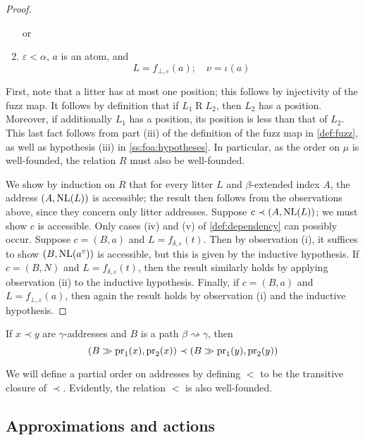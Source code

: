 \begin{proof}
\begin{enumerate}
        or
        \item \( \varepsilon < \alpha \), \( a \) is an atom, and
        \[ L = f_{\bot,\varepsilon}(a); \quad \nu = \iota(a) \]
    \end{enumerate}
    First, note that a litter has at most one position; this follows by injectivity of the fuzz map.
    It follows by definition that if \( L_1 \mathrel{R} L_2 \), then \( L_2 \) has a position.
    Moreover, if additionally \( L_1 \) has a position, its position is less than that of \( L_2 \).
    This last fact follows from part (iii) of the definition of the fuzz map in \cref{def:fuzz}, as well as hypothesis (iii) in \cref{ss:foa:hypotheses}.
    In particular, as the order on \( \mu \) is well-founded, the relation \( R \) must also be well-founded.

    We show by induction on \( R \) that for every litter \( L \) and \( \beta \)-extended index \( A \), the address \( (A, \operatorname{NL}(L)) \) is accessible; the result then follows from the observations above, since they concern only litter addresses.
    Suppose \( c \prec (A, \operatorname{NL}(L)) \); we must show \( c \) is accessible.
    Only cases (iv) and (v) of \cref{def:dependency} can possibly occur.
    Suppose \( c = (B, a) \) and \( L = f_{\delta,\varepsilon}(t) \).
    Then by observation (i), it suffices to show \( (B, \operatorname{NL}(a^\circ)) \) is accessible, but this is given by the inductive hypothesis.
    If \( c = (B, N) \) and \( L = f_{\delta,\varepsilon}(t) \), then the result similarly holds by applying observation (ii) to the inductive hypothesis.
    Finally, if \( c = (B, a) \) and \( L = f_{\bot,\varepsilon}(a) \), then again the result holds by observation (i) and the inductive hypothesis.
\end{proof}

\begin{remark}
    If \( x \prec y \) are \( \gamma \)-addresses and \( B \) is a path \( \beta \rightsquigarrow \gamma \), then
    \[ (B \gg \operatorname{pr}_1(x), \operatorname{pr}_2(x)) \prec (B \gg \operatorname{pr}_1(y), \operatorname{pr}_2(y)) \]
\end{remark}

We will define a partial order on addresses by defining \( < \) to be the transitive closure of \( \prec \).
Evidently, the relation \( < \) is also well-founded.

\subsection{Approximations and actions}

